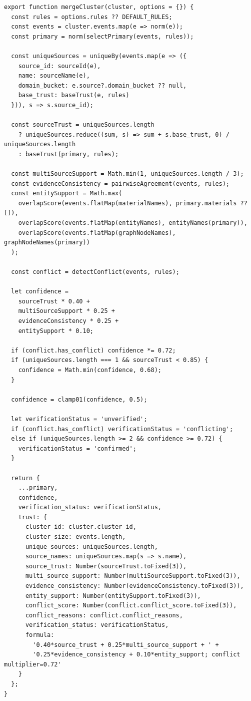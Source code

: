 \documentclass[12pt,a4paper]{article}
\begin{document}
\begin{lstlisting}[style=projectcode,caption={Trust Graph 事件相似度、聚类与置信度计算}]
export function mergeCluster(cluster, options = {}) {
  const rules = options.rules ?? DEFAULT_RULES;
  const events = cluster.events.map(e => norm(e));
  const primary = norm(selectPrimary(events, rules));

  const uniqueSources = uniqueBy(events.map(e => ({
    source_id: sourceId(e),
    name: sourceName(e),
    domain_bucket: e.source?.domain_bucket ?? null,
    base_trust: baseTrust(e, rules)
  })), s => s.source_id);

  const sourceTrust = uniqueSources.length
    ? uniqueSources.reduce((sum, s) => sum + s.base_trust, 0) / uniqueSources.length
    : baseTrust(primary, rules);

  const multiSourceSupport = Math.min(1, uniqueSources.length / 3);
  const evidenceConsistency = pairwiseAgreement(events, rules);
  const entitySupport = Math.max(
    overlapScore(events.flatMap(materialNames), primary.materials ?? []),
    overlapScore(events.flatMap(entityNames), entityNames(primary)),
    overlapScore(events.flatMap(graphNodeNames), graphNodeNames(primary))
  );

  const conflict = detectConflict(events, rules);

  let confidence =
    sourceTrust * 0.40 +
    multiSourceSupport * 0.25 +
    evidenceConsistency * 0.25 +
    entitySupport * 0.10;

  if (conflict.has_conflict) confidence *= 0.72;
  if (uniqueSources.length === 1 && sourceTrust < 0.85) {
    confidence = Math.min(confidence, 0.68);
  }

  confidence = clamp01(confidence, 0.5);

  let verificationStatus = 'unverified';
  if (conflict.has_conflict) verificationStatus = 'conflicting';
  else if (uniqueSources.length >= 2 && confidence >= 0.72) {
    verificationStatus = 'confirmed';
  }

  return {
    ...primary,
    confidence,
    verification_status: verificationStatus,
    trust: {
      cluster_id: cluster.cluster_id,
      cluster_size: events.length,
      unique_sources: uniqueSources.length,
      source_names: uniqueSources.map(s => s.name),
      source_trust: Number(sourceTrust.toFixed(3)),
      multi_source_support: Number(multiSourceSupport.toFixed(3)),
      evidence_consistency: Number(evidenceConsistency.toFixed(3)),
      entity_support: Number(entitySupport.toFixed(3)),
      conflict_score: Number(conflict.conflict_score.toFixed(3)),
      conflict_reasons: conflict.conflict_reasons,
      verification_status: verificationStatus,
      formula:
        '0.40*source_trust + 0.25*multi_source_support + ' +
        '0.25*evidence_consistency + 0.10*entity_support; conflict multiplier=0.72'
    }
  };
}
\end{lstlisting}
\end{document}
